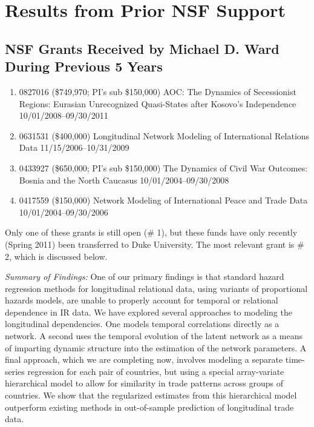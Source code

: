 \documentclass[pdftex,12pt,fullpage,oneside]{amsart}
\begin{document}
\section{Results from Prior NSF Support}


\subsection{NSF Grants Received by Michael D. Ward During Previous 5 Years}

\begin{enumerate}

\item 0827016 (\$749,970; PI's sub \$150,000) AOC: The Dynamics of
  Secessionist Regions: Eurasian Unrecognized Quasi-States after
  Kosovo's Independence 10/01/2008--09/30/2011

\item 0631531 (\$400,000) Longitudinal Network Modeling of
  International Relations Data 11/15/2006--10/31/2009

\item 0433927 (\$650,000; PI's sub \$150,000) The Dynamics of Civil
  War Outcomes: Bosnia and the North Caucasus 10/01/2004--09/30/2008

\item 0417559 (\$150,000) Network Modeling of International Peace and
  Trade Data 10/01/2004--09/30/2006

\end{enumerate}  Only one of these grants is still open (\# 1), but these funds have
only recently (Spring 2011) been transferred to Duke University. The
most relevant grant is \# 2, which is discussed below. \vspace{.1in}

\textit{Summary of Findings:} One of our primary findings is that
standard hazard regression methods for longitudinal relational data,
using variants of proportional hazards models, are unable to properly
account for temporal or relational dependence in IR data. We have
explored several approaches to modeling the longitudinal dependencies.
One models temporal correlations directly as a network.  A second uses
the temporal evolution of the latent network as a means of imparting
dynamic structure into the estimation of the network parameters.  A
final approach, which we are completing now, involves modeling a
separate time-series regression for each pair of countries, but using
a special array-variate hierarchical model to allow for similarity in
trade patterns across groups of countries. We show that the
regularized estimates from this hierarchical model outperform existing
methods in out-of-sample prediction of longitudinal trade data.
\end{document}
